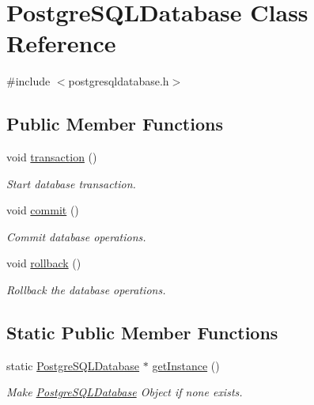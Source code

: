 \hypertarget{classPostgreSQLDatabase}{
\section{\-Postgre\-S\-Q\-L\-Database \-Class \-Reference}
\label{dc/d2c/classPostgreSQLDatabase}
}


{\ttfamily \#include $<$postgresqldatabase.\-h$>$}

\subsection*{\-Public \-Member \-Functions}
\begin{DoxyCompactItemize}
\item 
void \hyperlink{classPostgreSQLDatabase_a3814e1b3bfa2a3e7408a1e0855b28a45}{transaction} ()
\begin{DoxyCompactList}\small\item\em \-Start database transaction. \end{DoxyCompactList}\item 
void \hyperlink{classPostgreSQLDatabase_a267e5394770aa97c9e410bd3c9655a36}{commit} ()
\begin{DoxyCompactList}\small\item\em \-Commit database operations. \end{DoxyCompactList}\item 
void \hyperlink{classPostgreSQLDatabase_ac34287937b49aaa849627d987730ae2a}{rollback} ()
\begin{DoxyCompactList}\small\item\em \-Rollback the database operations. \end{DoxyCompactList}\end{DoxyCompactItemize}
\subsection*{\-Static \-Public \-Member \-Functions}
\begin{DoxyCompactItemize}
\item 
static \hyperlink{classPostgreSQLDatabase}{\-Postgre\-S\-Q\-L\-Database} $\ast$ \hyperlink{classPostgreSQLDatabase_afe0a9795acbfa2917ec3668c0ea1045b}{get\-Instance} ()
\begin{DoxyCompactList}\small\item\em \-Make \hyperlink{classPostgreSQLDatabase}{\-Postgre\-S\-Q\-L\-Database} \-Object if none exists. \end{DoxyCompactList}\end{DoxyCompactItemize}
